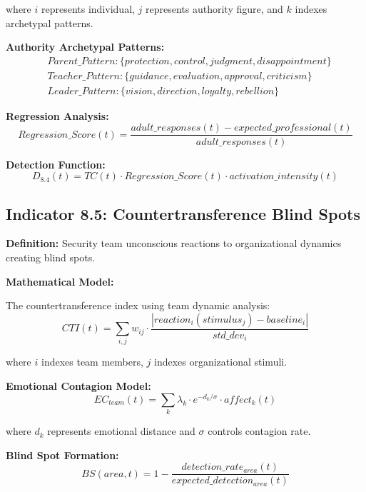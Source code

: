 \documentclass[11pt,a4paper]{article}
\begin{document}
where $i$ represents individual, $j$ represents authority figure, and $k$ indexes archetypal patterns.

\textbf{Authority Archetypal Patterns:}
\begin{align}
&Parent\_Pattern: \{protection, control, judgment, disappointment\} \\
&Teacher\_Pattern: \{guidance, evaluation, approval, criticism\} \\
&Leader\_Pattern: \{vision, direction, loyalty, rebellion\}
\end{align}

\textbf{Regression Analysis:}
\begin{equation}
Regression\_Score(t) = \frac{adult\_responses(t) - expected\_professional(t)}{adult\_responses(t)}
\end{equation}

\textbf{Detection Function:}
\begin{equation}
D_{8.4}(t) = TC(t) \cdot Regression\_Score(t) \cdot activation\_intensity(t)
\end{equation}

\subsection{Indicator 8.5: Countertransference Blind Spots}

\textbf{Definition:} Security team unconscious reactions to organizational dynamics creating blind spots.

\textbf{Mathematical Model:}

The countertransference index using team dynamic analysis:
\begin{equation}
CTI(t) = \sum_{i,j} w_{ij} \cdot \frac{|reaction_i(stimulus_j) - baseline_i|}{std\_dev_i}
\end{equation}

where $i$ indexes team members, $j$ indexes organizational stimuli.

\textbf{Emotional Contagion Model:}
\begin{equation}
EC_{team}(t) = \sum_{k} \lambda_k \cdot e^{-d_k/\sigma} \cdot affect_k(t)
\end{equation}

where $d_k$ represents emotional distance and $\sigma$ controls contagion rate.

\textbf{Blind Spot Formation:}
\begin{equation}
BS(area,t) = 1 - \frac{detection\_rate_{area}(t)}{expected\_detection_{area}(t)}
\end{equation}
\end{document}
